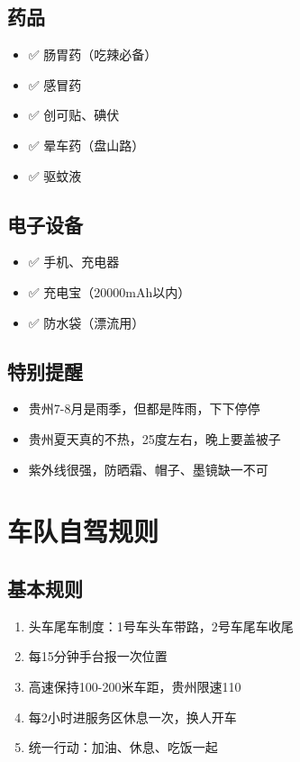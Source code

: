 \documentclass[12pt,a4paper,UTF8]{ctexart}
\begin{document}
\subsection{药品}
\begin{itemize}
\item ✅ 肠胃药（吃辣必备）
\item ✅ 感冒药
\item ✅ 创可贴、碘伏
\item ✅ 晕车药（盘山路）
\item ✅ 驱蚊液
\end{itemize}

\subsection{电子设备}
\begin{itemize}
\item ✅ 手机、充电器
\item ✅ 充电宝（20000mAh以内）
\item ✅ 防水袋（漂流用）
\end{itemize}

\subsection{特别提醒}
\begin{itemize}
\item 贵州7-8月是雨季，但都是阵雨，下下停停
\item 贵州夏天真的不热，25度左右，晚上要盖被子
\item 紫外线很强，防晒霜、帽子、墨镜缺一不可
\end{itemize}

\newpage

\section{车队自驾规则}

\subsection{基本规则}
\begin{enumerate}
\item 头车尾车制度：1号车头车带路，2号车尾车收尾
\item 每15分钟手台报一次位置
\item 高速保持100-200米车距，贵州限速110
\item 每2小时进服务区休息一次，换人开车
\item 统一行动：加油、休息、吃饭一起
\end{enumerate}
\end{document}

